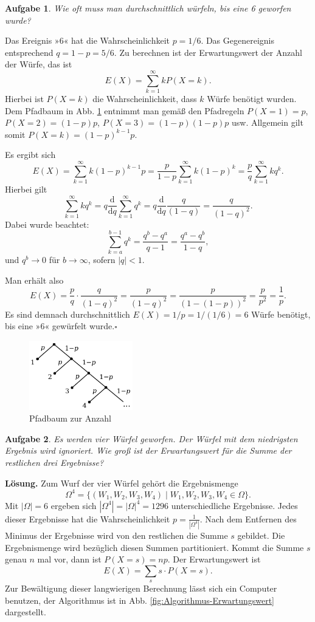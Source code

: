\documentclass[a4paper,10pt,fleqn,twoside]{scrartcl}
\numberwithin{equation}{section}
\newcommand{\strong}[1]{{\normalfont\sffamily\bfseries #1}}
\renewcommand{\qedsymbol}{\ensuremath{\square}}
\theoremstyle{Aufgabe}
\newtheorem{Aufgabe}{\sffamily Aufgabe}[section]
\begin{document}
\begin{Aufgabe}
Wie oft muss man durchschnittlich würfeln, bis eine 6 geworfen wurde?
\end{Aufgabe}

\noindent\strong{Lösung.}
Das Ereignis »6« hat die Wahrscheinlichkeit $p=1/6$. Das
Gegenereignis entsprechend $q=1-p=5/6$. Zu berechnen ist der
Erwartungswert der Anzahl der Würfe, das ist
\[E(X) = \sum_{k=1}^\infty kP(X=k).\]
Hierbei ist $P(X=k)$ die Wahrscheinlichkeit, dass $k$ Würfe
benötigt wurden. Dem Pfadbaum in Abb. \ref{fig:Pfadbaum-zur-Anzahl} entnimmt
man gemäß den Pfadregeln $P(X=1)=p$, $P(X=2)=(1-p)p$,
$P(X=3)=(1-p)(1-p)p$ usw. Allgemein gilt somit $P(X=k)=(1-p)^{k-1}p$.

Es ergibt sich
\[E(X) = \sum_{k=1}^\infty k(1-p)^{k-1}p
= \frac{p}{1-p}\sum_{k=1}^\infty k(1-p)^k
= \frac{p}{q}\sum_{k=1}^\infty kq^k.\]
Hierbei gilt
\[\sum_{k=1}^\infty kq^k = q\frac{\mathrm d}{\mathrm dq}
\sum_{k=1}^\infty q^k = q\frac{\mathrm d}{\mathrm dq}\frac{q}{(1-q)}
= \frac{q}{(1-q)^2}.\]
Dabei wurde beachtet:
\[\sum_{k=a}^{b-1}q^k = \frac{q^b-q^a}{q-1}
= \frac{q^a-q^b}{1-q},\]
und $q^b\to 0$ für $b\to\infty$, sofern $|q|<1$.

Man erhält also
\[E(X) = \frac{p}{q}\cdot \frac{q}{(1-q)^2} = \frac{p}{(1-q)^2}
= \frac{p}{(1-(1-p))^2} = \frac{p}{p^2} = \frac{1}{p}.\]
Es sind demnach durchschnittlich $E(X)=1/p=1/(1/6)=6$ Würfe
benötigt, bis eine »6« gewürfelt wurde.\;\qedsymbol

\begin{figure}[t]
\begin{center}
\includegraphics[width=0.4\textwidth]{img/Pfadbaum-zur-Anzahl.pdf}
\end{center}
\caption{Pfadbaum zur Anzahl}
\label{fig:Pfadbaum-zur-Anzahl}
\end{figure}

\begin{Aufgabe}
Es werden vier Würfel geworfen. Der Würfel mit dem niedrigsten
Ergebnis wird ignoriert. Wie groß ist der Erwartungswert für die
Summe der restlichen drei Ergebnisse?
\end{Aufgabe}
\strong{Lösung.} Zum Wurf der vier Würfel gehört die Ergebnismenge%
\[\Omega^4 = \{(W_1,W_2,W_3,W_4)\mid W_1,W_2,W_3,W_4\in\Omega\}.\]
Mit $|\Omega|=6$ ergeben sich $|\Omega^4|=|\Omega|^4 = 1296$
unterschiedliche Ergebnisse. Jedes dieser Ergebnisse hat die
Wahrscheinlichkeit $p=\frac{1}{|\Omega^4|}$. Nach dem Entfernen
des Minimus der Ergebnisse wird von den restlichen die Summe $s$
gebildet. Die Ergebnismenge wird bezüglich diesen Summen
partitioniert. Kommt die Summe $s$ genau $n$ mal vor, dann
ist $P(X=s)=np$. Der Erwartungswert ist%
\[E(X) = \sum_s s\cdot P(X=s).\]
Zur Bewältigung dieser langwierigen Berechnung lässt sich ein
Computer benutzen, der Algorithmus ist in Abb.
\ref{fig:Algorithmus-Erwartungswert} dargestellt.
\end{document}
